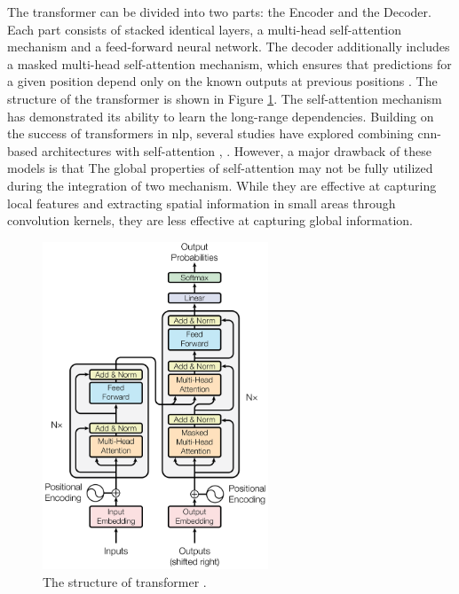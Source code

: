 The transformer can be divided into two parts: the Encoder and the Decoder. Each part consists of stacked identical layers, a multi-head self-attention mechanism and a feed-forward neural network. The decoder additionally includes a masked multi-head self-attention mechanism, which ensures that predictions for a given position depend only on the known outputs at previous positions \cite{vaswani_attention_2023}. The structure of the transformer is shown in Figure \ref{fig:transformer}. The self-attention mechanism has demonstrated its ability to learn the long-range dependencies. Building on the success of transformers in \gls{nlp}, several studies have explored combining \gls{cnn}-based architectures with self-attention \cite{wang_Non-local_2017}, \cite{carion_End-to-End_2020}. However, a major drawback of these models is that The global properties of self-attention may not be fully utilized during the integration of two mechanism. While they are effective at capturing local features and extracting spatial information in small areas through convolution kernels, they are less effective at capturing global information.
\begin{figure}
    \centering
    \includegraphics[width=0.6\textwidth]{graphics/structure_transformer.png}
    \caption{The structure of transformer \cite{vaswani_attention_2023}.}
    \label{fig:transformer}
\end{figure}

